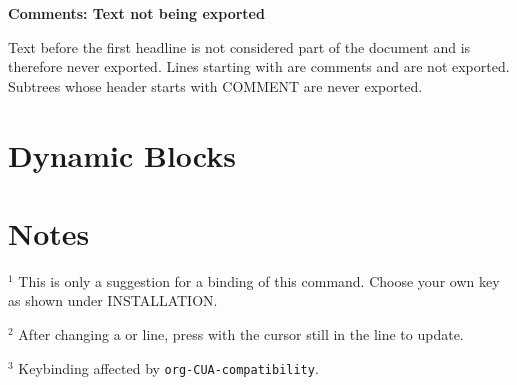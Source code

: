 %
%


{\bf Comments: Text not being exported}

Text before the first headline is not considered part of the document
and is therefore never exported.
Lines starting with \kbd{\#} are comments and are not exported.
Subtrees whose header starts with COMMENT are never exported.


\section{Dynamic Blocks}


\section{Notes}
$^1$ This is only a suggestion for a binding of this command.  Choose
your own key as shown under INSTALLATION.

$^2$ After changing a  or  line,
press  with the cursor still in the line to update.

$^3$ Keybinding affected by {\tt org-CUA-compatibility}.

\copyrightnotice

\bye



